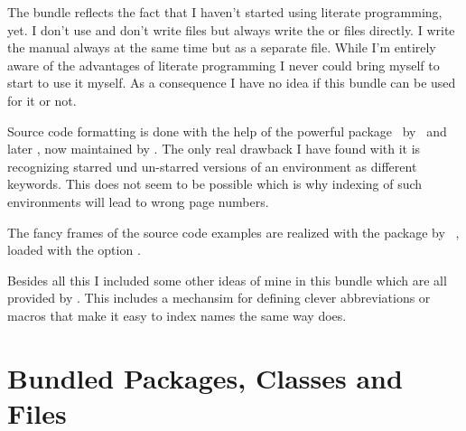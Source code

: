 \documentclass[load-preamble+,babel-options={ngerman,english}]{cnltx-doc}
\newcommand*\file[1]{\code{#1}}
\begin{document}
The bundle reflects the fact that I haven't started using literate
programming, yet.  I don't use  and don't write \file{dtx}
files but always write the \file{sty} or  files directly.  I write
the manual always at the same time but as a separate file.  While I'm entirely
aware of the advantages of literate programming I never could bring myself to
start to use it myself.  As a consequence I have no idea if this bundle can be
used for it or not.

Source code formatting is done with the help of the powerful
 package~\cite{pkg:listings} by \heinz\ and later \moses, now
maintained by \hoffmann.  The only real drawback I have found with it is
recognizing starred und un-starred versions of an environment as different
keywords.  This does not seem to be possible which is why indexing of such
environments will lead to wrong page numbers.

The fancy frames of the source code examples are realized with the
 package by \daniel~\cite{pkg:mdframed}, loaded with the option
.

Besides all this I included some other ideas of mine in this bundle which are
all provided by \cnltxtools.  This includes a mechansim for defining clever
abbreviations or macros that make it easy to index names the same way
 does.


\section{Bundled Packages, Classes and Files}
\end{document}
